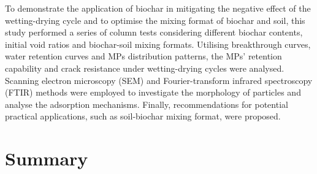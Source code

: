 To demonstrate the application of biochar in mitigating the negative effect of the wetting-drying cycle and to optimise the mixing format of biochar and soil, this study performed a series of column tests considering different biochar contents, initial void ratios and biochar-soil mixing formats. Utilising breakthrough curves, water retention curves and MPs distribution patterns, the MPs' retention capability and crack resistance under wetting-drying cycles were analysed. Scanning electron microscopy (SEM) and Fourier-transform infrared spectroscopy (FTIR) methods were employed to investigate the morphology of particles and analyse the adsorption mechanisms. Finally, recommendations for potential practical applications, such as soil-biochar mixing format, were proposed. \par

\section{Summary}